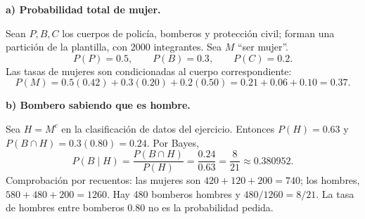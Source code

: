 \textbf{a) Probabilidad total de mujer.}\par\nopagebreak[4]
Sean $P,B,C$ los cuerpos de policía, bomberos y protección civil; forman una partición de la plantilla, con 2000 integrantes. Sea $M$ ``ser mujer''.
\[
P(P)=0.5,\qquad P(B)=0.3,\qquad P(C)=0.2.
\]
Las tasas de mujeres son condicionadas al cuerpo correspondiente:
\[
P(M)=0.5(0.42)+0.3(0.20)+0.2(0.50)
=0.21+0.06+0.10=\boxed{0.37}.
\]

\textbf{b) Bombero sabiendo que es hombre.}\par\nopagebreak[4]
Sea $H=M^c$ en la clasificación de datos del ejercicio. Entonces $P(H)=0.63$ y $P(B\cap H)=0.3(0.80)=0.24$. Por Bayes,
\[
P(B\mid H)=\frac{P(B\cap H)}{P(H)}
=\frac{0.24}{0.63}=\boxed{\frac8{21}\approx0.380952}.
\]
Comprobación por recuentos: las mujeres son $420+120+200=740$; los hombres, $580+480+200=1260$. Hay 480 bomberos hombres y $480/1260=8/21$. La tasa de hombres entre bomberos 0.80 no es la probabilidad pedida.
